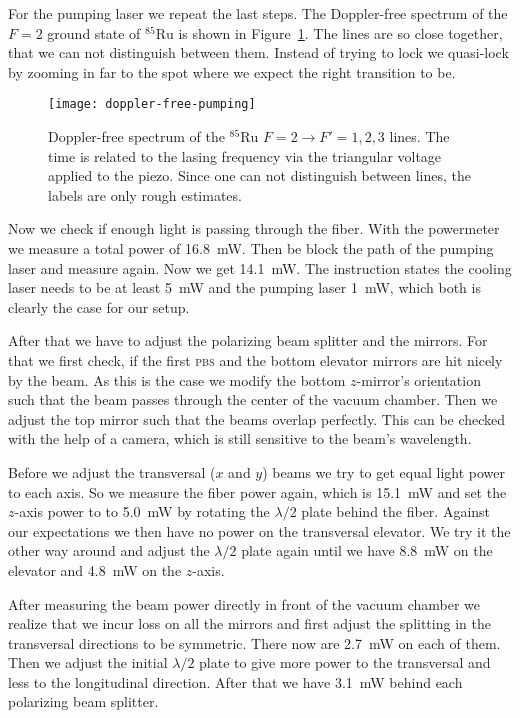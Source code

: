 \documentclass[11pt, english, fleqn, DIV=15, headinclude, BCOR=2cm]{scrreprt}
\begin{document}
For the pumping laser we repeat the last steps. The Doppler-free spectrum of the
$F=2$ ground state of ${}^{85}\text{Ru}$ is shown in
Figure~\ref{fig:doppler-free-pumping}. The lines are so close together, that we
can not distinguish between them. Instead of trying to lock we quasi-lock by
zooming in far to the spot where we expect the right transition to be.

\begin{figure}
    \centering
    \texttt{[image: doppler-free-pumping]}
    \caption{%
        Doppler-free spectrum of the ${}^{85}\text{Ru}$ $F=2 \to F'=1,2,3$
        lines. The time is related to the lasing frequency via the triangular
        voltage applied to the piezo. Since one can not distinguish between
        lines, the labels are only rough estimates. 
    }
    \label{fig:doppler-free-pumping}
\end{figure}

Now we check if enough light is passing through the fiber. With the
powermeter we measure a total power of \SI{16.8}{\milli\watt}. Then be block
the path of the pumping laser and measure again. Now we get
\SI{14.1}{\milli\watt}. The instruction states the cooling laser needs to be at
least \SI{5}{\milli\watt} and the pumping laser \SI{1}{\milli\watt}, which both
is clearly the case for our setup.

After that we have to adjust the polarizing beam splitter and the mirrors. For
that we first check, if the first \textsc{pbs} and the bottom elevator mirrors
are hit nicely by the beam. As this is the case we modify the bottom
$z$-mirror's orientation such that the beam passes through the center of the
vacuum chamber. Then we adjust the top mirror such that the beams overlap
perfectly. This can be checked with the help of a camera, which is still
sensitive to the beam's wavelength.

Before we adjust the transversal ($x$ and $y$) beams we try to get equal light
power to each axis. So we measure the fiber power again, which is
\SI{15.1}{\milli\watt} and set the $z$-axis power to to \SI{5.0}{\milli\watt}
by rotating the $\lambda/2$ plate behind the fiber. Against our expectations we
then have no power on the transversal elevator. We try it the other way around
and adjust the $\lambda/2$ plate again until we have \SI{8.8}{\milli\watt} on
the elevator and \SI{4.8}{\milli\watt} on the $z$-axis.

After measuring the beam power directly in front of the vacuum chamber we
realize that we incur loss on all the mirrors and first adjust the splitting in
the transversal directions to be symmetric. There now are \SI{2.7}{\milli\watt}
on each of them. Then we adjust the initial $\lambda/2$ plate to give more
power to the transversal and less to the longitudinal direction. After that we
have \SI{3.1}{\milli\watt} behind each polarizing beam splitter.
\end{document}
